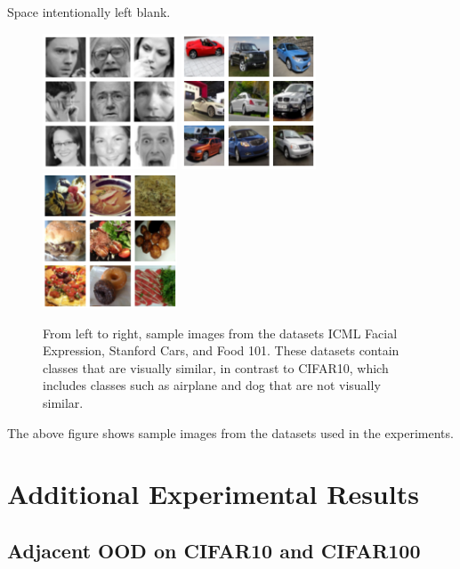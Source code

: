 \documentclass{article} %
\theoremstyle{plain}
\theoremstyle{definition}
\theoremstyle{remark}
\begin{document}
\label{fig:icmlface}

Space intentionally left blank. 

\clearpage
\begin{figure}[ht]
    \centering\includegraphics[width=4cm]{../images/icmlface.png} \hfill
    \includegraphics[width=4cm]{../images/cars.png} \hfill
    \includegraphics[width=4cm]{../images/food101.png}
    \caption{From left to right, sample images from the datasets ICML Facial Expression, Stanford Cars, and Food 101. These datasets contain classes that are visually similar, in contrast to CIFAR10, which includes classes such as airplane and dog that are not visually similar.}
    \label{fig:icmlface images}
\end{figure}

The above figure shows sample images from the datasets used in the experiments.

\section{Additional Experimental Results}

\subsection{Adjacent OOD on CIFAR10 and CIFAR100}
\end{document}
